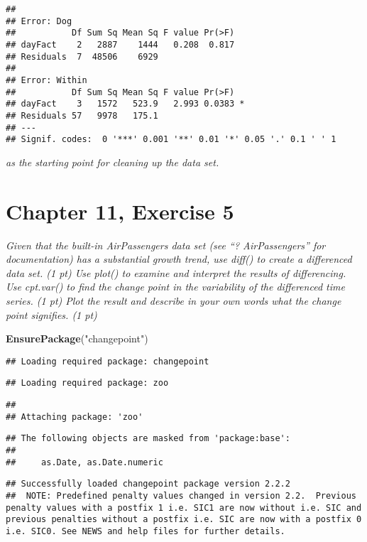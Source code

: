 \documentclass[]{article}
\newenvironment{Shaded}{\begin{snugshade}}{\end{snugshade}}
\newcommand{\KeywordTok}[1]{\textcolor[rgb]{0.13,0.29,0.53}{\textbf{#1}}}
\newcommand{\NormalTok}[1]{#1}
\newcommand{\StringTok}[1]{\textcolor[rgb]{0.31,0.60,0.02}{#1}}
\begin{document}
\begin{verbatim}
## 
## Error: Dog
##           Df Sum Sq Mean Sq F value Pr(>F)
## dayFact    2   2887    1444   0.208  0.817
## Residuals  7  48506    6929               
## 
## Error: Within
##           Df Sum Sq Mean Sq F value Pr(>F)  
## dayFact    3   1572   523.9   2.993 0.0383 *
## Residuals 57   9978   175.1                 
## ---
## Signif. codes:  0 '***' 0.001 '**' 0.01 '*' 0.05 '.' 0.1 ' ' 1
\end{verbatim}

\emph{as the starting point for cleaning up the data set.}

\hypertarget{chapter-11-exercise-5}{%
\section{Chapter 11, Exercise 5}\label{chapter-11-exercise-5}}

\emph{Given that the built-in AirPassengers data set (see ``?
AirPassengers'' for documentation) has a substantial growth trend, use
diff() to create a differenced data set. (1 pt) Use plot() to examine
and interpret the results of differencing. Use cpt.var() to find the
change point in the variability of the differenced time series. (1 pt)
Plot the result and describe in your own words what the change point
signifies. (1 pt)}

\begin{Shaded}
\begin{Highlighting}[]
\KeywordTok{EnsurePackage}\NormalTok{(}\StringTok{"changepoint"}\NormalTok{)}
\end{Highlighting}
\end{Shaded}

\begin{verbatim}
## Loading required package: changepoint
\end{verbatim}

\begin{verbatim}
## Loading required package: zoo
\end{verbatim}

\begin{verbatim}
## 
## Attaching package: 'zoo'
\end{verbatim}

\begin{verbatim}
## The following objects are masked from 'package:base':
## 
##     as.Date, as.Date.numeric
\end{verbatim}

\begin{verbatim}
## Successfully loaded changepoint package version 2.2.2
##  NOTE: Predefined penalty values changed in version 2.2.  Previous penalty values with a postfix 1 i.e. SIC1 are now without i.e. SIC and previous penalties without a postfix i.e. SIC are now with a postfix 0 i.e. SIC0. See NEWS and help files for further details.
\end{verbatim}
\end{document}
